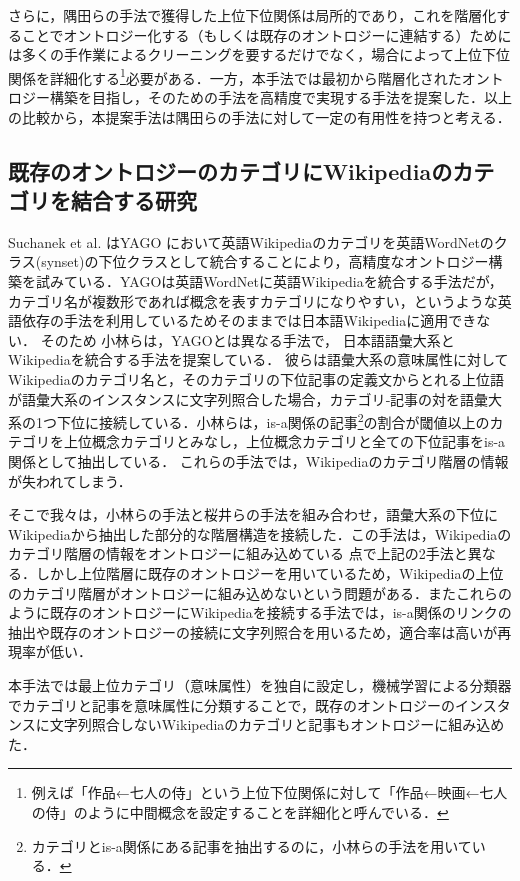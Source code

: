 \documentclass[japanese]{jnlp_1.4}
\begin{document}
さらに，隅田らの手法で獲得した上位下位関係は局所的であり，これを階層化することでオントロジー化する（もしくは既存のオントロジーに連結する）ためには多くの手作業によるクリーニングを要する\cite{Kuroda}だけでなく，場合によって上位下位関係を詳細化する\footnote{例えば「作品←七人の侍」という上位下位関係に対して「作品←映画←七人の侍」のように中間概念を設定することを詳細化と呼んでいる．}必要がある\cite{Yamada}．一方，本手法では最初から階層化されたオントロジー構築を目指し，そのための手法を高精度で実現する手法を提案した．以上の比較から，本提案手法は隅田らの手法に対して一定の有用性を持つと考える．

\subsection{既存のオントロジーのカテゴリにWikipediaのカテゴリを結合する研究}

Suchanek et al. \cite{Suchanek}はYAGO において英語Wikipediaのカテゴリを英語WordNetのクラス(synset)の下位クラスとして統合することにより，高精度なオントロジー構築を試みている．YAGOは英語WordNetに英語Wikipediaを統合する手法だが，カテゴリ名が複数形であれば概念を表すカテゴリになりやすい，というような英語依存の手法を利用しているためそのままでは日本語Wikipediaに適用できない．
そのため
小林ら\citeyear{Kobayashi}は，YAGOとは異なる手法で，
日本語語彙大系とWikipediaを統合する手法を提案している．
彼らは語彙大系の意味属性に対してWikipediaのカテゴリ名と，そのカテゴリの下位記事の定義文からとれる上位語が語彙大系のインスタンスに文字列照合した場合，カテゴリ‐記事の対を語彙大系の1つ下位に接続している．小林ら\citeyear{Kobayashi2}は，is-a関係の記事\footnote{カテゴリとis-a関係にある記事を抽出するのに，小林ら\citeyear{Kobayashi}の手法を用いている．}の割合が閾値以上のカテゴリを上位概念カテゴリとみなし，上位概念カテゴリと全ての下位記事をis-a関係として抽出している．
これらの手法では，Wikipediaのカテゴリ階層の情報が失われてしまう．

そこで我々は，小林ら\citeyear{Kobayashi}の手法と桜井ら\citeyear{Sakurai}の手法を組み合わせ，語彙大系の下位にWikipediaから抽出した部分的な階層構造を接続した\cite{Shibaki}．この手法は，Wikipediaのカテゴリ階層の情報をオントロジーに組み込めている
点で上記の2手法と異なる．しかし上位階層に既存のオントロジーを用いているため，Wikipediaの上位のカテゴリ階層がオントロジーに組み込めないという問題がある．またこれらのように既存のオントロジーにWikipediaを接続する手法では，is-a関係のリンクの抽出や既存のオントロジーの接続に文字列照合を用いるため，適合率は高いが再現率が低い．

本手法では最上位カテゴリ（意味属性）を独自に設定し，機械学習による分類器でカテゴリと記事を意味属性に分類することで，既存のオントロジーのインスタンスに文字列照合しないWikipediaのカテゴリと記事もオントロジーに組み込めた．\\
\end{document}
